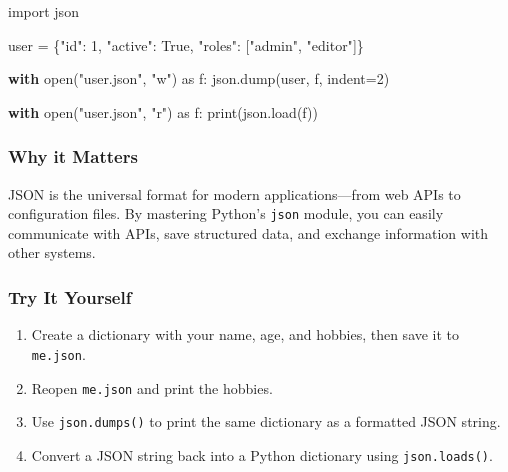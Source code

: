 \documentclass[
  letterpaper,
  DIV=11,
  numbers=noendperiod]{scrreprt}
\newenvironment{Shaded}{\begin{snugshade}}{\end{snugshade}}
\newcommand{\BuiltInTok}[1]{\textcolor[rgb]{0.00,0.23,0.31}{#1}}
\newcommand{\ControlFlowTok}[1]{\textcolor[rgb]{0.00,0.23,0.31}{\textbf{#1}}}
\newcommand{\DecValTok}[1]{\textcolor[rgb]{0.68,0.00,0.00}{#1}}
\newcommand{\ImportTok}[1]{\textcolor[rgb]{0.00,0.46,0.62}{#1}}
\newcommand{\NormalTok}[1]{\textcolor[rgb]{0.00,0.23,0.31}{#1}}
\newcommand{\OperatorTok}[1]{\textcolor[rgb]{0.37,0.37,0.37}{#1}}
\newcommand{\StringTok}[1]{\textcolor[rgb]{0.13,0.47,0.30}{#1}}
\newcommand{\VariableTok}[1]{\textcolor[rgb]{0.07,0.07,0.07}{#1}}
\providecommand{\tightlist}{%
  \setlength{\itemsep}{0pt}\setlength{\parskip}{0pt}}
\begin{document}
\begin{Shaded}
\begin{Highlighting}[]
\ImportTok{import}\NormalTok{ json}

\NormalTok{user }\OperatorTok{=}\NormalTok{ \{}\StringTok{"id"}\NormalTok{: }\DecValTok{1}\NormalTok{, }\StringTok{"active"}\NormalTok{: }\VariableTok{True}\NormalTok{, }\StringTok{"roles"}\NormalTok{: [}\StringTok{"admin"}\NormalTok{, }\StringTok{"editor"}\NormalTok{]\}}

\ControlFlowTok{with} \BuiltInTok{open}\NormalTok{(}\StringTok{"user.json"}\NormalTok{, }\StringTok{"w"}\NormalTok{) }\ImportTok{as}\NormalTok{ f:}
\NormalTok{    json.dump(user, f, indent}\OperatorTok{=}\DecValTok{2}\NormalTok{)}

\ControlFlowTok{with} \BuiltInTok{open}\NormalTok{(}\StringTok{"user.json"}\NormalTok{, }\StringTok{"r"}\NormalTok{) }\ImportTok{as}\NormalTok{ f:}
    \BuiltInTok{print}\NormalTok{(json.load(f))}
\end{Highlighting}
\end{Shaded}

\subsubsection{Why it Matters}\label{why-it-matters-57}

JSON is the universal format for modern applications---from web APIs to
configuration files. By mastering Python's \texttt{json} module, you can
easily communicate with APIs, save structured data, and exchange
information with other systems.

\subsubsection{Try It Yourself}\label{try-it-yourself-57}

\begin{enumerate}
\def\labelenumi{\arabic{enumi}.}
\tightlist
\item
  Create a dictionary with your name, age, and hobbies, then save it to
  \texttt{me.json}.
\item
  Reopen \texttt{me.json} and print the hobbies.
\item
  Use \texttt{json.dumps()} to print the same dictionary as a formatted
  JSON string.
\item
  Convert a JSON string back into a Python dictionary using
  \texttt{json.loads()}.
\end{enumerate}
\end{document}

